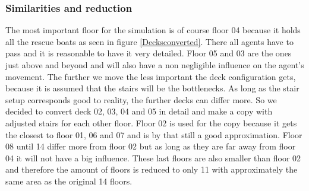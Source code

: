 \documentclass[11pt]{article}
\begin{document}
\subsubsection{Similarities and reduction}
The most important floor for the simulation is of course floor 04 because it holds all the rescue boats as seen in figure \ref{Decksconverted}. There all agents have to pass and it is reasonable to have it very detailed. Floor 05 and 03 are the ones just above and beyond and will also have a non negligible influence on the agent’s movement.
\newline
The further we move the less important the deck configuration gets, because it is assumed that the stairs will be the bottlenecks. As long as the stair setup corresponds good to reality, the further decks can differ more.
So we decided to convert deck 02, 03, 04 and 05 in detail and make a copy with adjusted stairs for each other floor. Floor 02 is used for the copy because it gets the closest to floor 01, 06 and 07 and is by that still a good approximation.
\newline
Floor 08 until 14 differ more from floor 02 but as long as they are far away from floor 04 it will not have a big influence. These last floors are also smaller than floor 02 and therefore the amount of floors is reduced to only 11 with approximately the same area as the original 14 floors.
\end{document}
